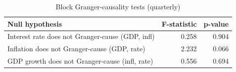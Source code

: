 \begin{table}

\caption{\label{tab:granger}Block Granger-causality tests (quarterly)}
\centering
\begin{tabular}[t]{lrr}
\toprule
Null hypothesis & F-statistic & p-value\\
\midrule
Interest rate does not Granger-cause (GDP, infl) & 0.258 & 0.904\\
Inflation does not Granger-cause (GDP, rate) & 2.232 & 0.066\\
GDP growth does not Granger-cause (infl, rate) & 0.556 & 0.694\\
\bottomrule
\end{tabular}
\end{table}
